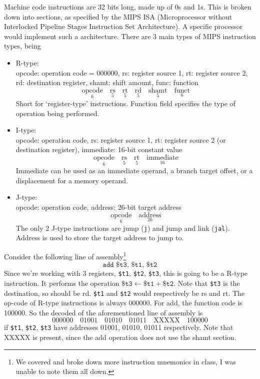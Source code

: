 Machine code instructions are 32 bits long, made up of 0s and 1s. This is broken down into sections, as specified by the MIPS ISA (Microprocessor without Interlocked Pipeline Stages Instruction Set Architecture). A specific processor would implement such a architecture. There are 3 main types of MIPS instruction types, being
\begin{itemize}
\item R-type: \\
    opcode: operation code = 000000, rs: register source 1, rt: register source 2, rd: destination register, shamt: shift amount, func: function
\[
    \underset{6}{\text{opcode}} \quad \underset{5}{\text{rs}} \quad \underset{5}{\text{rt}} \quad \underset{5}{\text{rd}} \quad \underset{5}{\text{shamt}} \quad \underset{6}{\text{funct}}
\]
Short for `register-type' instructions. Function field specifies the type of operation being performed.
\item I-type: \\
opcode: operation code, rs: register source 1, rt: register source 2 (or destination register), immediate: 16-bit constant value
\[
    \underset{6}{\text{opcode}} \quad \underset{5}{\text{rs}} \quad \underset{5}{\text{rt}} \quad \underset{16}{\text{immediate}}
\]
Immediate can be used as an immediate operand, a branch target offset, or a displacement for a memory operand.
\item J-type: \\
opcode: operation code, address: 26-bit target address
\[
    \underset{6}{\text{opcode}} \quad \underset{26}{\text{address}}
\]
    The only 2 J-type instructions are jump (\texttt{j}) and jump and link (\texttt{jal}). Address is used to store the target address to jump to.
\end{itemize}

Consider the following line of assembly\footnote{We covered and broke down more instruction mnemonics in class, I was unable to note them all down.}
\[
\texttt{add \$t3, \$t1, \$t2}
\]
Since we're working with 3 registers, \texttt{\$t1}, \texttt{\$t2}, \texttt{\$t3}, this is going to be a R-type instruction. It performs the operation $\texttt{\$t3} \leftarrow \texttt{\$t1} + \texttt{\$t2}$. Note that \texttt{\$t3} is the destination, so should be rd. \texttt{\$t1} and \texttt{\$t2} would respectively be rs and rt. The op-code of R-type instructions is always 000000. For add, the function code is 100000. So the decoded of the aforementioned line of assembly is
\[
000000 \quad 01001 \quad 01010 \quad 01011 \quad \text{XXXXX} \quad 100000
\]
if \texttt{\$t1}, \texttt{\$t2}, \texttt{\$t3} have addresses 01001, 01010, 01011 respectively. Note that XXXXX is present, since the add operation does not use the shamt section.
